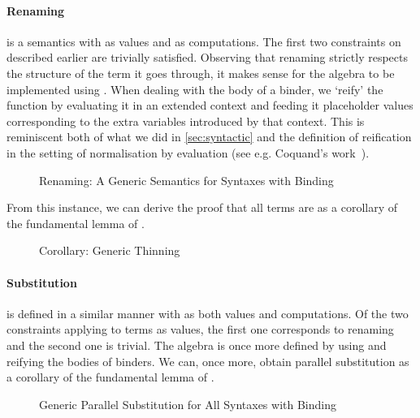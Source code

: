 \paragraph{Renaming} is a semantics with  as values and  as computations.
The first two constraints on  described earlier are trivially satisfied. Observing
that renaming strictly respects the structure of the term it goes through, it makes
sense for the algebra to be implemented using . When dealing with the body
of a binder, we `reify' the  function by evaluating it in an extended
context and feeding it placeholder values corresponding to the extra variables
introduced by that context. This is reminiscent both of what we did in
\cref{sec:syntactic} and the definition of reification in the setting of normalisation
by evaluation (see e.g. Coquand's work~\citeyear{coquand2002formalised}).

\begin{figure}[h]
\caption{Renaming: A Generic Semantics for Syntaxes with Binding\label{fig:genrensem}}
\end{figure}

From this instance, we can derive the proof that all terms are  as
a corollary of the fundamental lemma of .

\begin{figure}[h]
\caption{Corollary: Generic Thinning\label{fig:genren}}
\end{figure}

\paragraph{Substitution} is defined in a similar manner with 
as both values and computations. Of the two constraints applying to
terms as values, the first one corresponds to renaming and the second
one is trivial. The algebra is once more defined by using  and
reifying the bodies of binders. We can, once more, obtain parallel
substitution as a corollary of the fundamental lemma of .

\begin{figure}[h]
\caption{Generic Parallel Substitution for All Syntaxes with Binding\label{fig:gensub}}
\end{figure}

